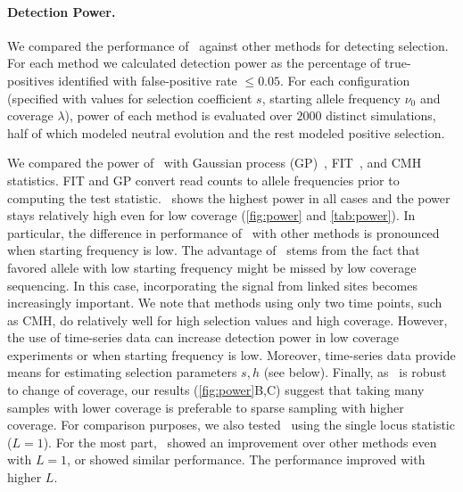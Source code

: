 \paragraph{Detection Power.} 
We compared the performance of \comale\ against other methods for
detecting selection. For each method we calculated detection power as
the percentage of true-positives identified with false-positive rate
$\le 0.05$. For each configuration (specified with values for
selection coefficient $s$, starting allele frequency $\nu_0$ and
coverage $\lambda$), power of each method is evaluated over $2000$
distinct simulations, half of which modeled neutral evolution and the
rest modeled positive selection.



We compared the power of \comale\ with Gaussian process
(GP)~\cite{Terhorst2015Multi}, FIT~\cite{feder2014Identifying}, and
CMH~\cite{agresti2011categorical} statistics.  FIT and GP convert read
counts to allele frequencies prior to computing the test statistic.
\comale\ shows the highest power in all cases and the power stays
relatively high even for low coverage (\ref{fig:power} and
\ref{tab:power}). In particular, the difference in performance of
\comale\ with other methods is pronounced when starting frequency is
low.  The advantage of \comale\ stems from the fact that favored
allele with low starting frequency might be missed by low coverage
sequencing. In this case, incorporating the signal from linked sites
becomes increasingly important. We note that methods using only two
time points, such as CMH, do relatively well for high selection values
and high coverage. However, the use of time-series data can increase
detection power in low coverage experiments or when starting frequency
is low. Moreover, time-series data provide means for estimating
selection parameters $s,h$ (see below). Finally, as \comale\ is robust
to change of coverage, our results (\ref{fig:power}B,C) suggest that
taking many samples with lower coverage is preferable to sparse
sampling with higher coverage. For comparison purposes, we also tested
\comale\ using the single locus statistic ($L=1$). For the most part,
\comale\ showed an improvement over other methods even with $L=1$, or
showed similar performance. The performance improved with higher $L$.


